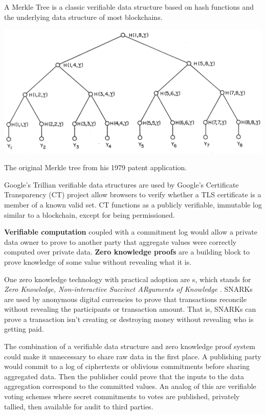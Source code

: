 \documentclass[nobib]{tufte-handout}
\begin{document}
A Merkle Tree \cite{merkle1979} is a classic verifiable data structure based on
hash functions and the underlying data structure of most blockchains.

\begin{marginfigure} \includegraphics[width=\linewidth]{merkle} \caption{The
original Merkle tree from his 1979 patent application.} \label{fig:merkle}
\end{marginfigure}

Google’s Trillian \cite{google-trillian} verifiable data structures are used by
Google's Certificate Transparency (CT) project allow browsers to verify whether
a TLS certificate is a member of a known valid set. CT functions as a publicly
verifiable, immutable log similar to a blockchain, except for being
permissioned.

\textbf{Verifiable computation} coupled with a commitment log would allow a
private data owner to prove to another party that aggregate values were correctly
computed over private data. \textbf{Zero knowledge proofs} are a building block
to prove knowledge of some value without revealing what it is.

One zero knowledge technology with practical adoption are s,
which stands for \textit{Zero Knowledge, Non-interactive Succinct ARguments of
Knowledge} \cite{DBLP:conf/sp/Ben-SassonCG0MTV14}. SNARKs are used by anonymous
digital currencies to prove that transactions reconcile without revealing the
participants or transaction amount. That is, SNARKs can prove a transaction
isn’t creating or destroying money without revealing who is getting paid.

The combination of a verifiable data structure and zero knowledge proof system
could make it unnecessary to share raw data in the first place. A publishing
party would commit to a log of ciphertexts or oblivious commitments before
sharing aggregated data. Then the publisher could prove that the inputs to the
data aggregation correspond to the committed values. An analog of this are
verifiable voting schemes where secret commitments to votes are published,
privately tallied, then available for audit to third parties.
\end{document}
